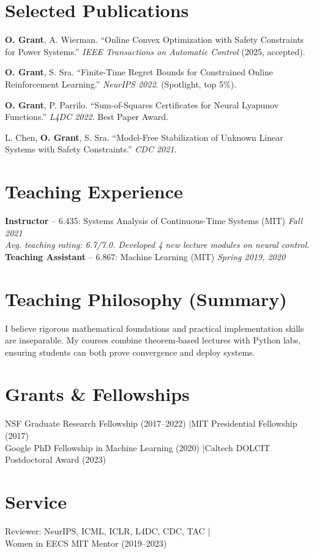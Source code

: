 \documentclass[11pt,a4paper]{article}
\begin{document}
\section{Selected Publications}
\begin{enumerate}[leftmargin=*, label={[\arabic*]}]
  \item \textbf{O. Grant}, A. Wierman. ``Online Convex Optimization with Safety Constraints for Power Systems.'' \textit{IEEE Transactions on Automatic Control} (2025, accepted).
  \item \textbf{O. Grant}, S. Sra. ``Finite-Time Regret Bounds for Constrained Online Reinforcement Learning.'' \textit{NeurIPS 2022}. (Spotlight, top 5\%).
  \item \textbf{O. Grant}, P. Parrilo. ``Sum-of-Squares Certificates for Neural Lyapunov Functions.'' \textit{L4DC 2022}. Best Paper Award.
  \item L. Chen, \textbf{O. Grant}, S. Sra. ``Model-Free Stabilization of Unknown Linear Systems with Safety Constraints.'' \textit{CDC 2021}.
\end{enumerate}

\section{Teaching Experience}
\noindent\textbf{Instructor} -- 6.435: Systems Analysis of Continuous-Time Systems (MIT) \hfill \textit{Fall 2021}\\
\textit{Avg. teaching rating: 6.7/7.0. Developed 4 new lecture modules on neural control.}\\[3pt]
\noindent\textbf{Teaching Assistant} -- 6.867: Machine Learning (MIT) \hfill \textit{Spring 2019, 2020}

\section{Teaching Philosophy (Summary)}
I believe rigorous mathematical foundations and practical implementation skills are inseparable. My courses combine theorem-based lectures with Python labs, ensuring students can both prove convergence and deploy systems.

\section{Grants \& Fellowships}
NSF Graduate Research Fellowship (2017--2022) \quad|\quad MIT Presidential Fellowship (2017)\\
Google PhD Fellowship in Machine Learning (2020) \quad|\quad Caltech DOLCIT Postdoctoral Award (2023)

\section{Service}
Reviewer: NeurIPS, ICML, ICLR, L4DC, CDC, TAC \quad|\quad \\ Women in EECS MIT Mentor (2019--2023)
\end{document}
